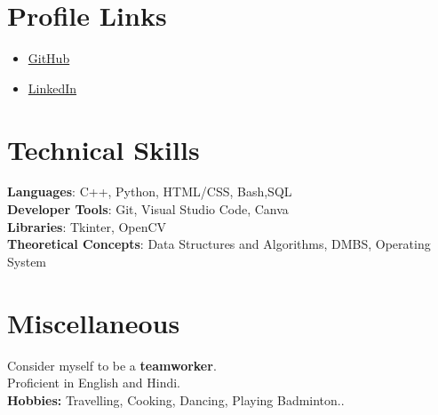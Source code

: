 \documentclass[a4paper,20pt]{article}
\newcommand{\resumeItem}[1]{
  \item\small{
    {#1 \vspace{-2pt}}
  }
}
\newcommand{\resumeItemListStart}{\begin{itemize}}
\newcommand{\resumeItemListEnd}{\end{itemize}\vspace{-5pt}}
\begin{document}
\section{Profile Links}
 \begin{itemize}[leftmargin=0.15in, label={}]
    \resumeItemListStart
        \resumeItem {\href{https://github.com/anushraya}{GitHub}}
        
        \resumeItem {\href{https://www.linkedin.com/in/anushraya-sharma-9a967a204}{LinkedIn}}
      \resumeItemListEnd
 \end{itemize}
 \vspace{-16pt}

%
\section{Technical Skills}
 \begin{itemize}[leftmargin=0.15in, label={}]
    \small{\item{
     \textbf{Languages}{: C++, Python, HTML/CSS, Bash,SQL} \\
     \textbf{Developer Tools}{: Git, Visual Studio Code, Canva} \\
     \textbf{Libraries}{: Tkinter, OpenCV} \\
     \textbf{Theoretical Concepts}{: Data Structures and Algorithms, DMBS, Operating System} \\
    }}
 \end{itemize}
 \vspace{-16pt}

%
\section{Miscellaneous}
 \begin{itemize}[leftmargin=0.15in, label={}]
    \small{\item{
     {Consider myself to be a \textbf{teamworker}.} \\
     {Proficient in English and Hindi.} \\
     {\textbf{Hobbies:}  Travelling, Cooking, Dancing, Playing Badminton..} \\
    }}
 \end{itemize}
 \vspace{-16pt}
\end{document}
